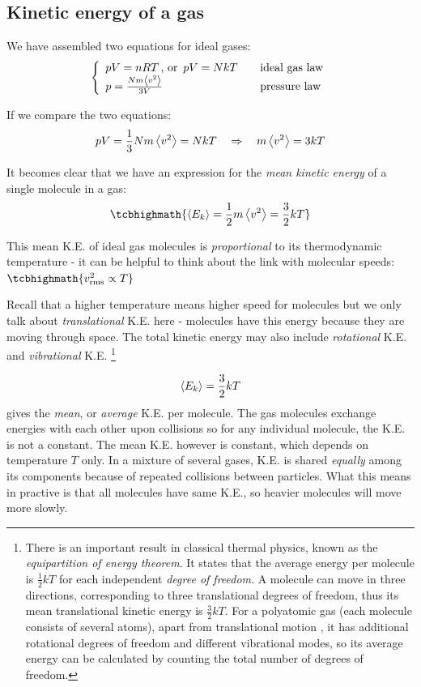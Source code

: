 \subsection{Kinetic energy of a gas}

We have assembled two equations for ideal gases:
\begin{equation*}
\left\{
	\begin{array}{ll}
	pV = nRT \, \text{, or } \, pV = NkT &\quad \text{ideal gas law} \\
	p = \frac{Nm\left< v^2 \right>}{3V} &\quad \text{pressure law}
	\end{array} \right.
\end{equation*}

If we compare the two equations: $$pV=\frac{1}{3}Nm\left< v^2 \right>=NkT \quad \Rightarrow \quad m\left< v^2 \right>=3kT$$

It becomes clear that we have an expression for the \emph{mean kinetic energy} of a single molecule in a gas: $$\tcbhighmath{\avg{E_k}=\frac{1}{2}m\avg{v^2}=\frac{3}{2}kT}$$

This mean K.E. of ideal gas molecules is \emph{proportional} to its thermodynamic temperature - it can be helpful to think about the link with molecular speeds: $\tcbhighmath{v_\text{rms}^2 \propto T}$

Recall that a higher temperature means higher speed for molecules but we only talk about \emph{translational} K.E. here - molecules have this energy because they are moving through space. The total kinetic energy may also include \emph{rotational} K.E. and \emph{vibrational} K.E.
\footnote{There is an important result in classical thermal physics, known as the \emph{equipartition of energy theorem}. It states that the average energy per molecule is $\frac{1}{2}kT$ for each independent \emph{degree of freedom}. A molecule can move in three directions, corresponding to three translational degrees of freedom, thus its mean translational kinetic energy is $\frac{3}{2}kT$. For a polyatomic gas (each molecule consists of several atoms), apart from translational motion , it has additional rotational degrees of freedom and different vibrational modes, so its average energy can be calculated by counting the total number of degrees of freedom.}

$$\left< E_k \right> = \frac{3}{2}k T$$ gives the \emph{mean}, or \emph{average} K.E. per molecule. The gas molecules exchange energies with each other upon collisions so for any individual molecule, the K.E. is not a constant. The mean K.E. however is constant, which depends on temperature $T$ only. In a mixture of several gases, K.E. is shared \emph{equally} among its components because of repeated collisions between particles. What this means in practive is that all molecules have same K.E., so heavier molecules will move more slowly.

